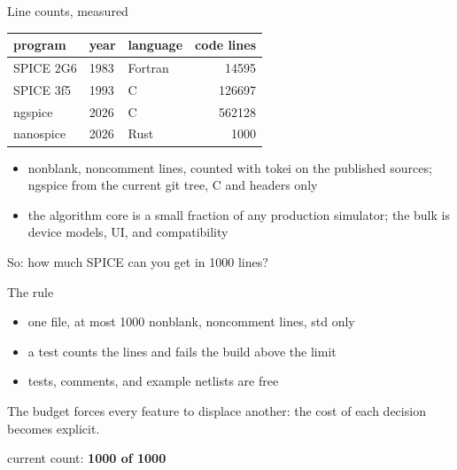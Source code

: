 \documentclass[11pt, aspectratio=169]{beamer}
\begin{document}
\begin{frame}{Line counts, measured}
\begin{center}
\begin{tabular}{lllr}
\toprule
program & year & language & code lines \\
\midrule
SPICE 2G6 & 1983 & Fortran & 14595 \\
SPICE 3f5 & 1993 & C & 126697 \\
ngspice & 2026 & C & 562128 \\
nanospice & 2026 & Rust & 1000 \\
\bottomrule
\end{tabular}
\end{center}
\vspace{2mm}
\begin{itemize}
\item nonblank, noncomment lines, counted with tokei on the published
      sources; ngspice from the current git tree, C and headers only
\item the algorithm core is a small fraction of any production
      simulator; the bulk is device models, UI, and compatibility
\end{itemize}
\vspace{2mm}
\begin{center}
So: how much SPICE can you get in 1000 lines?
\end{center}
\end{frame}

\begin{frame}{The rule}
\begin{itemize}
\item one file, at most 1000 nonblank, noncomment lines, std only
\item a test counts the lines and fails the build above the limit
\item tests, comments, and example netlists are free
\end{itemize}
\vspace{4mm}
The budget forces every feature to displace another: the cost of each
decision becomes explicit.
\vspace{4mm}
\begin{center}
{\large current count: \textbf{1000 of 1000}}
\end{center}
\end{frame}
\end{document}
